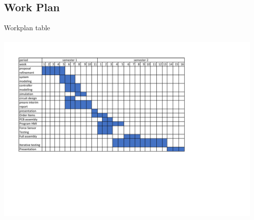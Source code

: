 \subsection{Work Plan}
\begin{center}
\begin{table}[!h]
\centering
\caption{Workplan table}
\paragraph{ }
\includegraphics[width=0.95\linewidth]{Figures/workplan}
\end{table}
\end{center}
